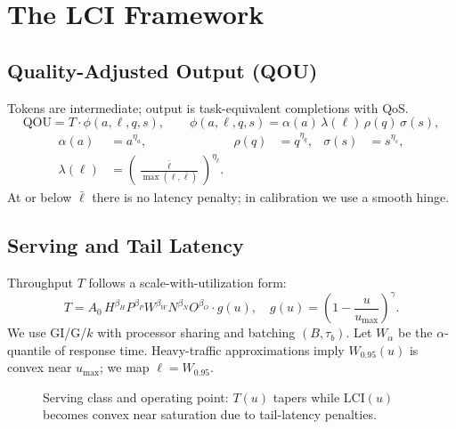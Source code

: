 \documentclass[12pt]{article}
\numberwithin{equation}{section}
\newcommand{\QOU}{\mathrm{QOU}}
\newcommand{\LCI}{\mathrm{LCI}}
\begin{document}
\section{The LCI Framework}

\subsection{Quality-Adjusted Output (QOU)}
Tokens are intermediate; output is task-equivalent completions with QoS.
\begin{equation}
\QOU = T \cdot \phi(a,\ell,q,s),\qquad
\phi(a,\ell,q,s)=\alpha(a)\,\lambda(\ell)\,\rho(q)\,\sigma(s),
\end{equation}
\begin{align}
\alpha(a)&=a^{\eta_a}, &
\rho(q)&=q^{\eta_q}, &
\sigma(s)&=s^{\eta_s},\\
\lambda(\ell)&=\left(\frac{\bar\ell}{\max(\ell,\bar\ell)}\right)^{\eta_\ell}.
\end{align}
At or below $\bar\ell$ there is no latency penalty; in calibration we use a smooth hinge.

\subsection{Serving and Tail Latency}
Throughput $T$ follows a scale-with-utilization form:
\begin{equation}
T = A_0\,H^{\beta_H} P^{\beta_P} W^{\beta_W} N^{\beta_N} O^{\beta_O}\cdot g(u),\quad
g(u)=\left(1-\frac{u}{u_{\max}}\right)^{\gamma}.
\end{equation}
We use GI/G/$k$ with processor sharing and batching $(B,\tau_b)$.  
Let $W_\alpha$ be the $\alpha$-quantile of response time.  
Heavy-traffic approximations imply $W_{0.95}(u)$ is convex near $u_{\max}$; we map $\ell=W_{0.95}$.

\begin{figure}[t]
\centering
{}
\caption{Serving class and operating point: $T(u)$ tapers while $\LCI(u)$ becomes convex near saturation due to tail-latency penalties.}
\label{fig:queue}
\end{figure}
\end{document}
